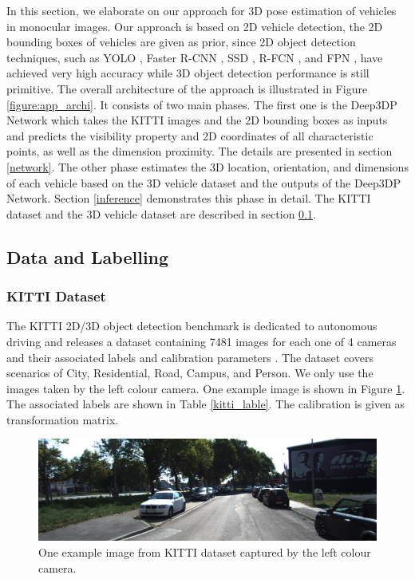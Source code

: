 \documentclass[a4paper,12pt]{article}
\begin{document}
In this section, we elaborate on our approach for 3D pose estimation of vehicles in monocular images. Our approach is based on 2D vehicle detection, \ie the 2D bounding boxes of vehicles are given as prior, since 2D object detection techniques, such as YOLO \cite{DBLP:journals/corr/RedmonF16}, Faster R-CNN \cite{DBLP:journals/corr/RenHG015}, SSD \cite{DBLP:journals/corr/LiuAESR15}, R-FCN \cite{DBLP:journals/corr/DaiLHS16}, and FPN \cite{DBLP:journals/corr/LinDGHHB16},  have achieved very high accuracy while 3D object detection performance is still primitive.  The overall architecture of the approach is illustrated in Figure \ref{figure:app_archi}. It consists of two main phases. The first one is the Deep3DP Network which takes the KITTI images and the 2D bounding boxes as inputs and predicts the visibility property and 2D coordinates of all characteristic points, as well as the dimension proximity. The details are presented in section \ref{network}.  The other phase estimates the 3D location, orientation, and dimensions of each vehicle based on the 3D vehicle dataset and the outputs of the Deep3DP Network. Section \ref{inference} demonstrates this phase in detail. The KITTI dataset and the 3D vehicle dataset are described in section \ref{data}.


\subsection{Data and Labelling}
\label{data}
\subsubsection{KITTI Dataset}
The KITTI 2D/3D object detection benchmark is dedicated to autonomous driving and releases a dataset containing 7481 images for each one of 4 cameras and their associated labels and calibration parameters \cite{Geiger2012CVPR}. The dataset covers scenarios of City, Residential, Road, Campus, and Person. We only use the images taken by the left colour camera. One example image is shown in Figure \ref{figure:kitti_image}. The associated labels are shown in Table \ref{kitti_lable}. The calibration is given as transformation matrix.

\begin{figure}[H]		
	\includegraphics[width=1\textwidth]{000010.png}
	\caption[One example image from KITTI dataset.]{One example image from KITTI dataset captured by the left colour camera.}
	\centering
	\label{figure:kitti_image}
\end{figure}
\end{document}
